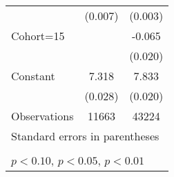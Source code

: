\begin{table}[htbp]
\begin{tabular}{l*{2}{c}}
                    &     (0.007)         &     (0.003)         \\
\addlinespace
Cohort=15           &                     &      -0.065\sym{***}\\
                    &                     &     (0.020)         \\
\addlinespace
Constant            &       7.318\sym{***}&       7.833\sym{***}\\
                    &     (0.028)         &     (0.020)         \\
\midrule
Observations        &       11663         &       43224         \\
\bottomrule
\multicolumn{3}{l}{\footnotesize Standard errors in parentheses}\\
\multicolumn{3}{l}{\footnotesize }\\
\multicolumn{3}{l}{\footnotesize \sym{*} \(p<0.10\), \sym{**} \(p<0.05\), \sym{***} \(p<0.01\)}\\
\end{tabular}
\end{table}
